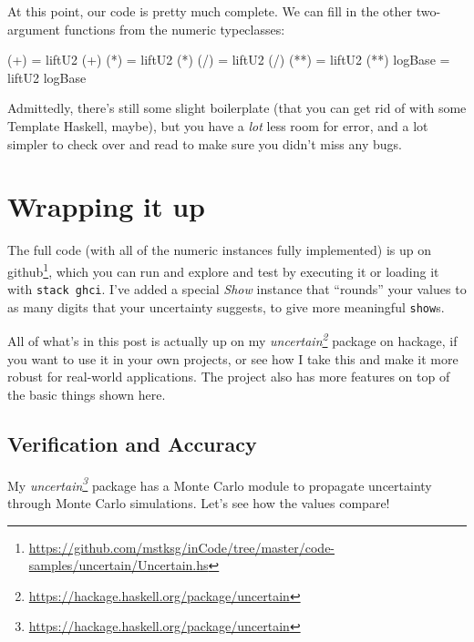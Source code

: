 \documentclass[]{article}
\newenvironment{Shaded}{}{}
\newcommand{\FunctionTok}[1]{\textcolor[rgb]{0.02,0.16,0.49}{#1}}
\newcommand{\NormalTok}[1]{#1}
\newcommand{\OperatorTok}[1]{\textcolor[rgb]{0.40,0.40,0.40}{#1}}
\newcommand{\OtherTok}[1]{\textcolor[rgb]{0.00,0.44,0.13}{#1}}
\renewcommand{\href}[2]{#2\footnote{\url{#1}}}
\begin{document}
At this point, our code is pretty much complete. We can fill in the other
two-argument functions from the numeric typeclasses:

\begin{Shaded}
\begin{Highlighting}[]
\NormalTok{(}\OperatorTok{+}\NormalTok{)     }\OtherTok{=}\NormalTok{ liftU2 (}\OperatorTok{+}\NormalTok{)}
\NormalTok{(}\OperatorTok{*}\NormalTok{)     }\OtherTok{=}\NormalTok{ liftU2 (}\OperatorTok{*}\NormalTok{)}
\NormalTok{(}\OperatorTok{/}\NormalTok{)     }\OtherTok{=}\NormalTok{ liftU2 (}\OperatorTok{/}\NormalTok{)}
\NormalTok{(}\OperatorTok{**}\NormalTok{)    }\OtherTok{=}\NormalTok{ liftU2 (}\OperatorTok{**}\NormalTok{)}
\FunctionTok{logBase} \OtherTok{=}\NormalTok{ liftU2 }\FunctionTok{logBase}
\end{Highlighting}
\end{Shaded}

Admittedly, there's still some slight boilerplate (that you can get rid of with
some Template Haskell, maybe), but you have a \emph{lot} less room for error,
and a lot simpler to check over and read to make sure you didn't miss any bugs.

\section{Wrapping it up}\label{wrapping-it-up}

The full code (with all of the numeric instances fully implemented) is up
\href{https://github.com/mstksg/inCode/tree/master/code-samples/uncertain/Uncertain.hs}{on
github}, which you can run and explore and test by executing it or loading it
with \texttt{stack\ ghci}. I've added a special \emph{Show} instance that
``rounds'' your values to as many digits that your uncertainty suggests, to give
more meaningful \texttt{show}s.

All of what's in this post is actually up on my
\emph{\href{https://hackage.haskell.org/package/uncertain}{uncertain}} package
on hackage, if you want to use it in your own projects, or see how I take this
and make it more robust for real-world applications. The project also has more
features on top of the basic things shown here.

\subsection{Verification and Accuracy}\label{verification-and-accuracy}

My \emph{\href{https://hackage.haskell.org/package/uncertain}{uncertain}}
package has a Monte Carlo module to propagate uncertainty through Monte Carlo
simulations. Let's see how the values compare!
\end{document}
